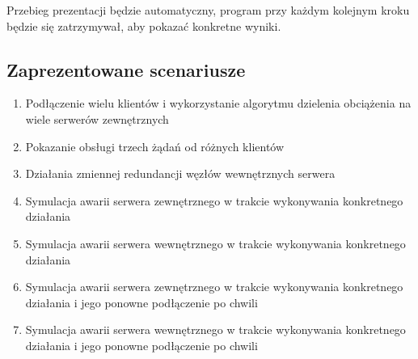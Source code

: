 \par{Przebieg prezentacji będzie automatyczny, program przy każdym kolejnym kroku będzie się zatrzymywał, aby pokazać konkretne wyniki.}

\subsection[Zaprezentowane scenariusze]{Zaprezentowane scenariusze}
\begin{enumerate}
\item Podłączenie wielu klientów i wykorzystanie algorytmu dzielenia obciążenia na wiele serwerów zewnętrznych
\item Pokazanie obsługi trzech żądań od różnych klientów
\item Działania zmiennej redundancji węzłów wewnętrznych serwera
\item Symulacja awarii serwera zewnętrznego w trakcie wykonywania konkretnego działania
\item Symulacja awarii serwera wewnętrznego w trakcie wykonywania konkretnego działania
\item Symulacja awarii serwera zewnętrznego w trakcie wykonywania konkretnego działania i jego ponowne podłączenie po chwili
\item Symulacja awarii serwera wewnętrznego w trakcie wykonywania konkretnego działania i jego ponowne podłączenie po chwili
\end{enumerate}